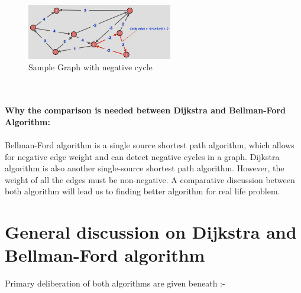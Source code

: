 \documentclass[a4paper,10pt]{article}
\begin{document}
\begin{figure}[h]
 \centering
  \includegraphics[width=2.5in]{negfiga.png}
    \caption{Sample Graph with negative cycle}
  \label{fig:neg fig a}
\end{figure}
\\\\
\textbf{Why the comparison is needed between Dijkstra and Bellman-Ford Algorithm:}\\\\
Bellman-Ford algorithm is a single source shortest path algorithm, which allows for negative edge weight and can detect negative cycles in a graph.
Dijkstra algorithm is also another single-source shortest path algorithm. However, the weight of all the edges must be non-negative. A comparative discussion between both algorithm will lead us to finding better algorithm for real life problem.
\\
\section{General discussion on Dijkstra and Bellman-Ford algorithm}
Primary deliberation of both algorithms are given beneath :-\
\end{document}
